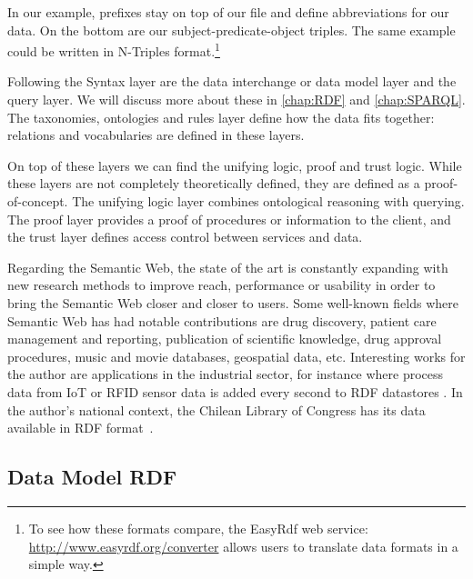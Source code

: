 In our example, prefixes stay on top of our file and define abbreviations for our data. On the bottom are our subject-predicate-object triples. The same example could be written in N-Triples format.\footnote{To see how these formats compare, the EasyRdf web service: \url{http://www.easyrdf.org/converter} allows users to translate data formats in a simple way.} 

Following the Syntax layer are the data interchange or data model layer and the query layer. We will discuss more about these in \autoref{chap:RDF} and \autoref{chap:SPARQL}. The taxonomies, ontologies and rules layer define how the data fits together: relations and vocabularies are defined in these layers.

On top of these layers we can find the unifying logic, proof and trust logic. While these layers are not completely theoretically defined, they are defined as a proof-of-concept. The unifying logic layer combines ontological reasoning with querying. The proof layer provides a proof of procedures or information to the client, and the trust layer defines access control between services and data.

Regarding the Semantic Web, the state of the art is constantly expanding with new research methods to improve reach, performance or usability in order to bring the Semantic Web closer and closer to users. Some well-known fields where Semantic Web has had notable contributions are drug discovery, patient care management and reporting, publication of scientific knowledge, drug approval procedures, music and movie databases, geospatial data, etc. Interesting works for the author are applications in the industrial sector, for instance where process data from IoT or RFID sensor data is added every second to RDF datastores \cite{Zhang2018,Soylu2018,Kharlamov2016}. In the author's national context, the Chilean Library of Congress has its data available in RDF format~\cite{datosbcn}.



\subsection{Data Model RDF}
\label{chap:RDF}

